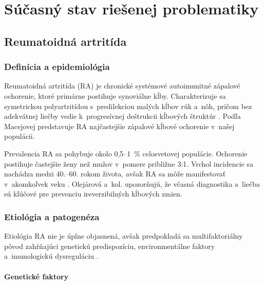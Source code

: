 ﻿%

\chapter{Súčasný stav riešenej problematiky}

\section{Reumatoidná artritída}

\subsection{Definícia a epidemiológia}

Reumatoidná artritída (RA) je chronické systémové autoimunitné zápalové ochorenie, ktoré primárne postihuje synoviálne kĺby. Charakterizuje sa symetrickou polyartritídou s~predilekciou malých kĺbov rúk a~nôh, pričom bez adekvátnej liečby vedie k~progresívnej deštrukcii kĺbových štruktúr \parencite{smolen2018}. Podľa Macejovej \parencite*{Macejova2019} predstavuje RA najčastejšie zápalové kĺbové ochorenie v~našej populácii.

Prevalencia RA sa pohybuje okolo 0,5--1~\% celosvetovej populácie. Ochorenie postihuje častejšie ženy než mužov v~pomere približne 3:1. Vrchol incidencie sa nachádza medzi 40.--60. rokom života, avšak RA sa môže manifestovať v~akomkoľvek veku \parencite{firestein2021}. Olejárová a~kol. \parencite*{Olejarova2016} upozorňujú, že včasná diagnostika a~liečba sú kľúčové pre prevenciu ireverzibilných kĺbových zmien.

\subsection{Etiológia a patogenéza}

Etiológia RA nie je úplne objasnená, avšak predpokladá sa multifaktoriálny pôvod zahŕňajúci genetickú predispozíciu, environmentálne faktory a~imunologickú dysreguláciu \parencite{smolen2018}.

\subsubsection{Genetické faktory}

